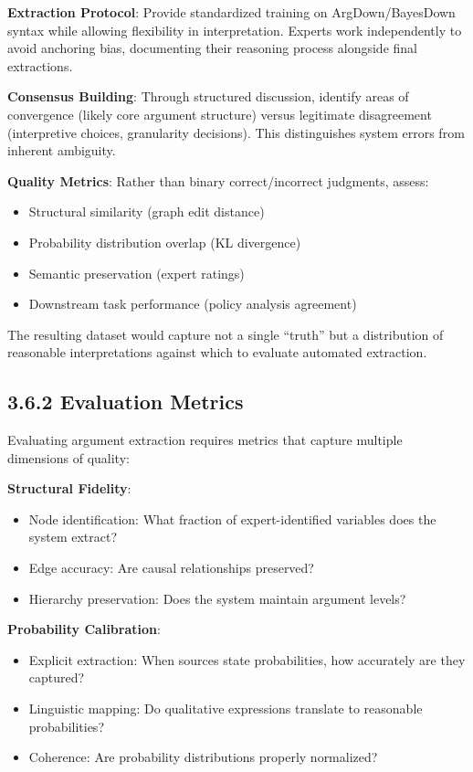 \documentclass[
  11pt,
  letterpaper,
  openany]{book}
\providecommand{\tightlist}{%
  \setlength{\itemsep}{0pt}\setlength{\parskip}{0pt}}
\begin{document}
\textbf{Extraction Protocol}: Provide standardized training on
ArgDown/BayesDown syntax while allowing flexibility in interpretation.
Experts work independently to avoid anchoring bias, documenting their
reasoning process alongside final extractions.

\textbf{Consensus Building}: Through structured discussion, identify
areas of convergence (likely core argument structure) versus legitimate
disagreement (interpretive choices, granularity decisions). This
distinguishes system errors from inherent ambiguity.

\textbf{Quality Metrics}: Rather than binary correct/incorrect
judgments, assess:

\begin{itemize}
\tightlist
\item
  Structural similarity (graph edit distance)
\item
  Probability distribution overlap (KL divergence)
\item
  Semantic preservation (expert ratings)
\item
  Downstream task performance (policy analysis agreement)
\end{itemize}

The resulting dataset would capture not a single ``truth'' but a
distribution of reasonable interpretations against which to evaluate
automated extraction.

\subsection{3.6.2 Evaluation Metrics}\label{sec-evaluation-metrics}

Evaluating argument extraction requires metrics that capture multiple
dimensions of quality:

\textbf{Structural Fidelity}:

\begin{itemize}
\tightlist
\item
  Node identification: What fraction of expert-identified variables does
  the system extract?
\item
  Edge accuracy: Are causal relationships preserved?
\item
  Hierarchy preservation: Does the system maintain argument levels?
\end{itemize}

\textbf{Probability Calibration}:

\begin{itemize}
\tightlist
\item
  Explicit extraction: When sources state probabilities, how accurately
  are they captured?
\item
  Linguistic mapping: Do qualitative expressions translate to reasonable
  probabilities?
\item
  Coherence: Are probability distributions properly normalized?
\end{itemize}
\end{document}
